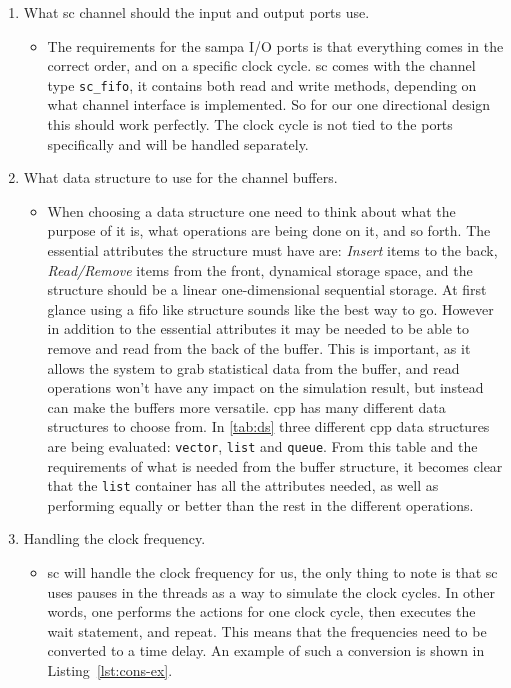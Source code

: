 \documentclass[a4paper, 12pt, openright, twoside]{report}
\newcommand{\codeword}[1]{\texttt{#1}}
\begin{document}
\begin{enumerate}
	\item What \gls{sc} channel should the input and output ports use.
	
		\begin{itemize}
		\item The requirements for the \gls{sampa} I/O ports is that everything comes in the correct order, and on a specific clock cycle.
		\gls{sc} comes with the channel type \codeword{sc\_fifo}, it contains both read and write methods, depending on what channel interface is implemented.
		So for our one directional design this should work perfectly.
		The clock cycle is not tied to the ports specifically and will be handled separately.
		\end{itemize}	
		
	\item What data structure to use for the channel buffers.
		\begin{itemize}
\item When choosing a data structure one need to think about what the purpose of it is, what operations are being done on it, and so forth.
		The essential attributes the structure must have are: \textit{Insert} items to the back, \textit{Read/Remove} items from the front, dynamical storage space, and the structure should be a linear one-dimensional sequential storage.
		At first glance using a \gls{fifo} like structure sounds like the best way to go.
		However in addition to the essential attributes it may be needed to be able to remove and read from the back of the buffer.
		This is important, as it allows the system to grab statistical data from the buffer, and read operations won't have any impact on the simulation result, but instead can make the buffers more versatile.
		\gls{cpp} has many different data structures to choose from.		
		In \ref{tab:ds} three different \gls{cpp} data structures are being evaluated: \codeword{vector}, \codeword{list} and \codeword{queue}.
		From this table and the requirements of what is needed from the buffer structure, it becomes clear that the \codeword{list} container has all the attributes needed, as well as performing equally or better than the rest in the different operations.
\end{itemize}
	\item Handling the clock frequency.
		\begin{itemize}
		\item \gls{sc} will handle the clock frequency for us, the only thing to note is that \gls{sc} uses pauses in the threads as a way to simulate the clock cycles.
		In other words, one performs the actions for one clock cycle, then executes the wait statement, and repeat.
		This means that the frequencies need to be converted to a time delay.	
		An example of such a conversion is shown in Listing~\ref{lst:cons-ex}.
		\end{itemize}	
	
\end{enumerate}
\end{document}

